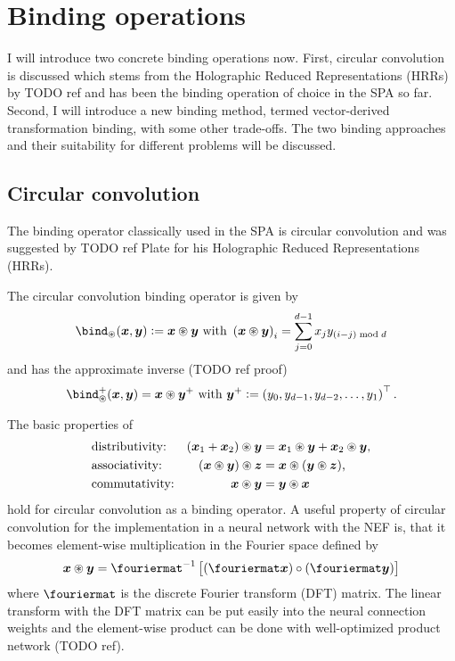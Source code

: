 \section{Binding operations}
I will introduce two concrete binding operations now.
First, circular convolution is discussed which stems from the Holographic Reduced Representations (HRRs) by TODO ref and has been the binding operation of choice in the SPA so far.
Second, I will introduce a new binding method, termed vector-derived transformation binding, with some other trade-offs.
The two binding approaches and their suitability for different problems will be discussed.

\subsection{Circular convolution}
The binding operator classically used in the SPA is circular convolution and was suggested by TODO ref Plate for his Holographic Reduced Representations (HRRs).
\begin{defn}
    The circular convolution binding operator is given by
    \begin{equation}
        \bind_{\circledast}(\vc x, \vc y) := \vc x \circledast \vc y\ \text{with}\ \del{\vc x \circledast \vc y}_i = \sum_{j=0}^{d - 1} x_j y_{(i - j) \bmod d}
    \end{equation}
    and has the approximate inverse (TODO ref proof)
    \begin{equation}
        \bind^+_{\circledast}(\vc x, \vc y) = \vc x \circledast \vc y^+\ \text{with}\ \vc y^+ := \del{y_0, y_{d-1}, y_{d-2}, \dotsc, y_1}\Tr \text{.}
    \end{equation}
\end{defn}

The basic properties of
\begin{align}
    &\text{distributivity:} &(\bm{x}_1 + \bm{x}_2) \circledast \bm{y} &= \bm{x}_1 \circledast \bm{y} + \bm{x}_2 \circledast \bm{y} \text{,}\\
    &\text{associativity:} &(\bm{x} \circledast \bm{y}) \circledast \bm{z} &= \bm{x} \circledast (\bm{y} \circledast \bm{z}) \text{,} \\
    &\text{commutativity:} &\bm{x} \circledast \bm{y} &= \bm{y} \circledast \bm{x}
\end{align}
hold for circular convolution as a binding operator.
A useful property of circular convolution for the implementation in a neural network with the NEF is, that it becomes element-wise multiplication in the Fourier space defined by
\begin{equation}
    \vc x \circledast \vc y = \fouriermat^{-1}\sbr{(\fouriermat \vc x) \circ (\fouriermat \vc y)}
\end{equation}
where $\fouriermat$ is the discrete Fourier transform (DFT) matrix.
The linear transform with the DFT matrix can be put easily into the neural connection weights and the element-wise product can be done with well-optimized product network (TODO ref).

